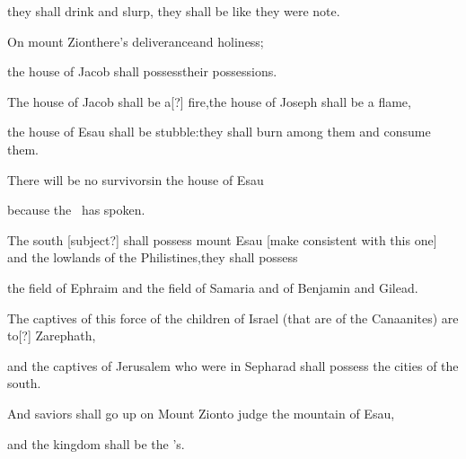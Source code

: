\begin{inparaenum}
  \pb they shall drink and slurp,%
  \pa they shall be like they were note.%
  
  \pa {} On mount Zion\pa there's deliverance\pa and holiness;%
  
  \pb the house of Jacob shall possess\pa their possessions.%
  
  \pa {} The house of Jacob shall be a[?] fire,\pa the house of Joseph shall be a flame,%
  
  \pb the house of Esau shall be stubble:\pa they shall burn among them and consume them.%
  
  \pb There will be no survivors\pa in the house of Esau%
  
  \pb because the \lord\ has spoken.%
  
  \pb {} The south [subject?] shall possess mount Esau [make consistent with this one] and the lowlands of the Philistines,\pa they shall possess%
  
  \pb the field%
  of Ephraim and the field of Samaria and of Benjamin%
  and Gilead.%
  
  \pb {} The captives of this force of the children of Israel (that are of the Canaanites) are to[?] Zarephath,%
  
  \pb and the captives of Jerusalem who were in Sepharad shall possess the cities of the south.%
  
  \pb {} And saviors shall go up on Mount Zion\pa to judge the mountain of Esau,%
  
  \pc and the kingdom shall be the \lord's.%
\end{inparaenum}
